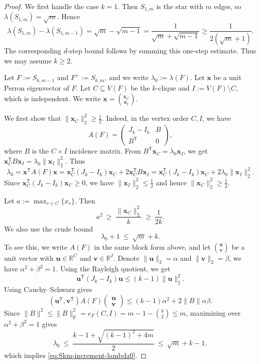 \documentclass[11pt]{article}
\theoremstyle{definition}
\theoremstyle{plain}
\begin{document}
\begin{proof}
We first handle the case \(k=1\). Then \(S_{1,m}\) is the star with \(m\) edges, so $\lambda(S_{1,m})=\sqrt m$. Hence
\[
        \lambda(S_{1,m})-\lambda(S_{1,m-1})
        =
        \sqrt m-\sqrt{m-1}
        =
        \frac{1}{\sqrt m+\sqrt{m-1}}
        \ge
        \frac{1}{2(\sqrt m+1)}.
\]
The corresponding \(d\)-step bound follows by summing this one-step estimate. Thus we may assume \(k\ge2\).

Let $F:=S_{k,m-1}$ and $F^+:=S_{k,m}$, and we write $\lambda_0:=\lambda(F)$.
Let $\bm{x}$ be a unit Perron eigenvector of $F$.
Let $C\subseteq V(F)$ be the $k$-clique and $I:=V(F)\setminus C$, which is independent. We  write $\bm{x}={\bm{x}_C \choose \bm{x}_I}$.

We first show that $\|\bm{x}_C\|_2^2\ge \tfrac12$.
Indeed, in the vertex order $C,I$, we have 
\[
  A(F)=
  \begin{pmatrix}
    J_k-I_k & B\\
    B^{\mathsf T} & 0
  \end{pmatrix},
\]
where $B$ is the $C\times I$ incidence matrix.
From $B^{\mathsf T} \bm{x}_C=\lambda_0 \bm{x}_I$, we get $\bm{x}_C^{\mathsf T}B \bm{x}_I=\lambda_0\| \bm{x}_I\|_2^2.$
Thus
\[
  \lambda_0
  =\bm{x}^{\mathsf T}A(F) \bm{x}
  = \bm{x}_C^{\mathsf T}(J_k-I_k) \bm{x}_C+ 2 \bm{x}_C^{\mathsf T}B \bm{x}_I 
  =
  \bm{x}_C^{\mathsf T}(J_k-I_k) \bm{x}_C+2\lambda_0\| \bm{x}_I\|_2^2.
\]
Since $\bm{x}_C^{\mathsf T}(J_k-I_k)\bm{x}_C\ge 0$, we have $\|\bm{x}_I\|_2^2\le \tfrac12$ and hence $\|\bm{x}_C\|_2^2\ge \tfrac12$.

Let $a:=\max_{v\in C} \{x_v\}$.
Then
\begin{equation}\label{eq:Skm-increment-a2}
  a^2\ \ge\ \frac{\|\bm{x}_C\|_2^2}{k}\ \ge\ \frac{1}{2k}.
\end{equation} 
We also use the crude bound
\begin{equation}\label{eq:Skm-increment-lambda0}
  \lambda_0+1\ \le\ \sqrt m+k.
\end{equation}
To see this, we write $A(F)$ in the same block form above, and let ${\bm{u} \choose \bm{v}}$ be a unit vector with $\bm{u}\in\mathbb R^C$ and $\bm{v} \in\mathbb R^I$.
Denote $\|\bm{u}\|_2=\alpha$ and $\|\bm{v}\|_2=\beta$, we have $\alpha^2+\beta^2=1$. 
Using the Rayleigh quotient, we get
\[
        \bm{u}^{\mathsf T}(J_k -I_k) \bm{u}
        \le
        (k-1) \|\bm{u}\|_2^2.
\]
Using Cauchy--Schwarz gives 
\[
  (\bm{u}^{\mathsf T},\bm{v}^{\mathsf T})A(F)
  \begin{pmatrix}
    \bm{u} \\ \bm{v}
  \end{pmatrix}
  \le
  (k-1)\alpha^2+2\|B\|\alpha\beta.
\]
Since $ \|B\|^2 \le \|B\|_{\mathrm F}^2=e_F(C,I)=m-1-\binom{k}{2}\le m$, maximizing over $\alpha^2+\beta^2=1$ gives
\[
  \lambda_0
  \ \le\
  \frac{k-1+\sqrt{(k-1)^2+4m}}{2}
  \ \le\
  \sqrt m+k-1,
\]
which implies \eqref{eq:Skm-increment-lambda0}.


\end{proof}
\end{document}
